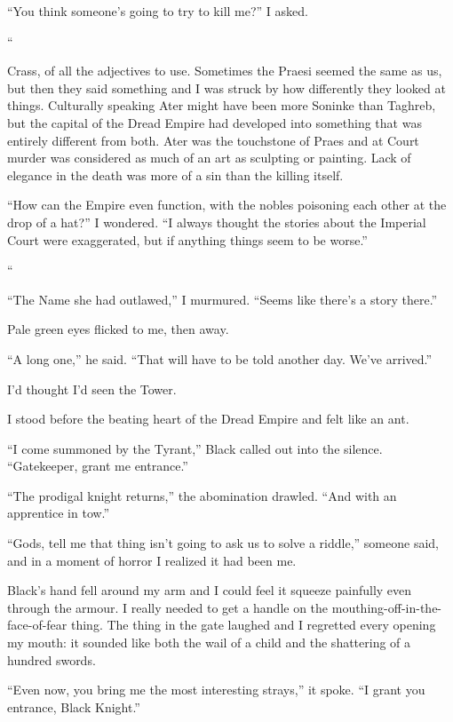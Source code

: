 \documentclass[12pt, openany]{book}
\begin{document}
“You think someone’s going to try to kill me?” I asked.



“

Crass, of all the adjectives to use. Sometimes the Praesi seemed the same as us, but then they said something and I was struck by how differently they looked at things. Culturally speaking Ater might have been more Soninke than Taghreb, but the capital of the Dread Empire had developed into something that was entirely different from both. Ater was the touchstone of Praes and at Court murder was considered as much of an art as sculpting or painting. Lack of elegance in the death was more of a sin than the killing itself.

“How can the Empire even function, with the nobles poisoning each other at the drop of a hat?” I wondered. “I always thought the stories about the Imperial Court were exaggerated, but if anything things seem to be worse.”

“

“The Name she had outlawed,” I murmured. “Seems like there’s a story there.”

Pale green eyes flicked to me, then away.

“A long one,” he said. “That will have to be told another day. We’ve arrived.”

I’d thought I’d seen the Tower. 

\textit{ }

I stood before the beating heart of the Dread Empire and felt like an ant.



“I come summoned by the Tyrant,” Black called out into the silence. “Gatekeeper, grant me entrance.”



“The prodigal knight returns,” the abomination drawled. “And with an apprentice in tow.”

“Gods, tell me that thing isn’t going to ask us to solve a riddle,” someone said, and in a moment of horror I realized it had been me.

Black’s hand fell around my arm and I could feel it squeeze painfully even through the armour. I really needed to get a handle on the mouthing-off-in-the-face-of-fear thing. The thing in the gate laughed and I regretted every opening my mouth: it sounded like both the wail of a child and the shattering of a hundred swords.

“Even now, you bring me the most interesting strays,” it spoke. “I grant you entrance, Black Knight.”
\end{document}
